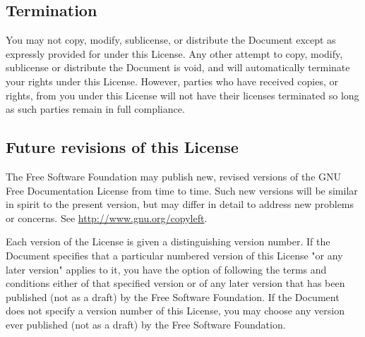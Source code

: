 	\subsection{Termination}
	You may not copy, modify, sublicense, or distribute the Document except as expressly provided for under this License. Any other attempt to copy, modify, sublicense or distribute the Document is void, and will automatically terminate your rights under this License. However, parties who have received copies, or rights, from you under this License will not have their licenses terminated so long as such parties remain in full compliance. 

	\subsection{Future revisions of this License}
	The Free Software Foundation may publish new, revised versions of the GNU Free Documentation License from time to time. Such new versions will be similar in spirit to the present version, but may differ in detail to address new problems or concerns. See \url{http://www.gnu.org/copyleft}. 

	Each version of the License is given a distinguishing version number. If the Document specifies that a particular numbered version of this License "or any later version" applies to it, you have the option of following the terms and conditions either of that specified version or of any later version that has been published (not as a draft) by the Free Software Foundation. If the Document does not specify a version number of this License, you may choose any version ever published (not as a draft) by the Free Software Foundation. 
	
	\begin{center}
	\end{center}
	
	\newpage
	\thispagestyle{empty}
	\mbox{}
